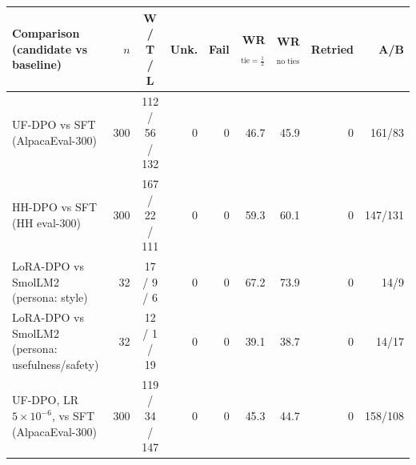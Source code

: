 \begin{tabular}{lrcrrrrrr}
\toprule
Comparison (candidate vs baseline) & $n$ & W / T / L & Unk. & Fail & WR$_{\text{tie}=\frac12}$ & WR$_{\text{no ties}}$ & Retried & A/B \\
\midrule
UF-DPO vs SFT (AlpacaEval-300) & 300 & 112 / 56 / 132 & 0 & 0 & 46.7 & 45.9 & 0 & 161/83 \\
HH-DPO vs SFT (HH eval-300) & 300 & 167 / 22 / 111 & 0 & 0 & 59.3 & 60.1 & 0 & 147/131 \\
LoRA-DPO vs SmolLM2 (persona: style) & 32 & 17 / 9 / 6 & 0 & 0 & 67.2 & 73.9 & 0 & 14/9 \\
LoRA-DPO vs SmolLM2 (persona: usefulness/safety) & 32 & 12 / 1 / 19 & 0 & 0 & 39.1 & 38.7 & 0 & 14/17 \\
UF-DPO, LR $5{\times}10^{-6}$, vs SFT (AlpacaEval-300) & 300 & 119 / 34 / 147 & 0 & 0 & 45.3 & 44.7 & 0 & 158/108 \\
\bottomrule
\end{tabular}
